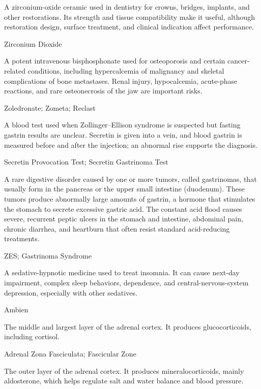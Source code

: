  A zirconium-oxide ceramic used in dentistry for crowns, bridges, implants, and other restorations. Its strength and tissue compatibility make it useful, although restoration design, surface treatment, and clinical indication affect performance.

\synonyms
Zirconium Dioxide

 A potent intravenous bisphosphonate used for osteoporosis and certain cancer-related conditions, including hypercalcemia of malignancy and skeletal complications of bone metastases. Renal injury, hypocalcemia, acute-phase reactions, and rare osteonecrosis of the jaw are important risks.

\synonyms
Zoledronate; Zometa; Reclast

 A blood test used when Zollinger--Ellison syndrome is suspected but fasting gastrin results are unclear. Secretin is given into a vein, and blood gastrin is measured before and after the injection; an abnormal rise supports the diagnosis.

\synonyms
Secretin Provocation Test; Secretin Gastrinoma Test

 A rare digestive disorder caused by one or more tumors, called gastrinomas, that usually form in the pancreas or the upper small intestine (duodenum). These tumors produce abnormally large amounts of gastrin, a hormone that stimulates the stomach to secrete excessive gastric acid. The constant acid flood causes severe, recurrent peptic ulcers in the stomach and intestine, abdominal pain, chronic diarrhea, and heartburn that often resist standard acid-reducing treatments.

\synonyms
ZES; Gastrinoma Syndrome

 A sedative-hypnotic medicine used to treat insomnia. It can cause next-day impairment, complex sleep behaviors, dependence, and central-nervous-system depression, especially with other sedatives.

\synonyms
Ambien

 The middle and largest layer of the adrenal cortex. It produces glucocorticoids, including cortisol.

\synonyms
Adrenal Zona Fasciculata; Fascicular Zone

 The outer layer of the adrenal cortex. It produces mineralocorticoids, mainly aldosterone, which helps regulate salt and water balance and blood pressure.

